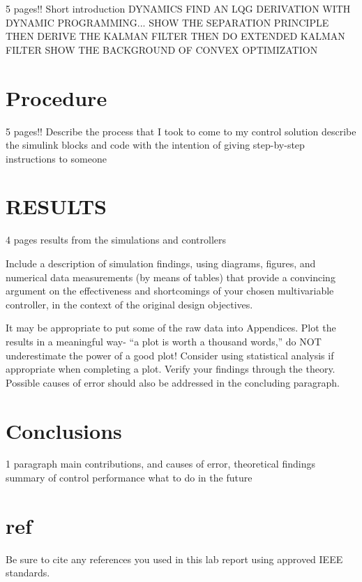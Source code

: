 \documentclass[conf]{new-aiaa}
\begin{document}
\begin{doublespace}
5 pages!!
Short introduction
DYNAMICS
FIND AN LQG DERIVATION WITH DYNAMIC PROGRAMMING...
SHOW THE SEPARATION PRINCIPLE
THEN DERIVE THE KALMAN FILTER
THEN DO EXTENDED KALMAN FILTER
SHOW THE BACKGROUND OF CONVEX OPTIMIZATION

\section{Procedure}
5 pages!!
Describe the process  that I took to come to my control solution
describe the simulink blocks and code
with the intention of giving step-by-step instructions to someone

\section{RESULTS}
4 pages
results from the simulations and controllers

Include a description of simulation findings, using diagrams, figures, and numerical data measurements (by means of tables) that provide a convincing argument on the effectiveness and shortcomings of
your chosen multivariable controller, in the context of the original design objectives. 

It may be appropriate to put some of the raw data into Appendices. Plot the results in a meaningful way- “a plot is worth a thousand words,” do NOT underestimate the power of a good plot! Consider using statistical analysis if appropriate when completing a plot. Verify your findings through the theory. Possible causes of error should also be addressed in the concluding paragraph.


\section{Conclusions}
1 paragraph
main contributions, and causes of error, theoretical findings
summary of control performance
what to do in the future

\section{ref}
Be sure to cite any references you used in this lab report using approved IEEE standards. 





\end{doublespace}

\end{document}
